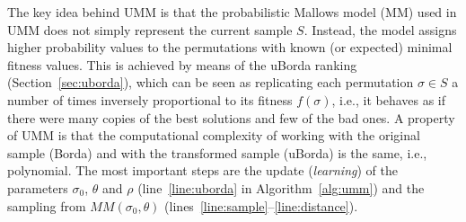 \documentclass[runningheads]{llncs}
\begin{document}
The key idea behind UMM is that the probabilistic Mallows model (MM) used in
UMM does not simply represent the current sample $S$. Instead, the model
assigns higher probability values to the permutations with known (or expected)
minimal fitness values. This is achieved by means of the uBorda ranking
(Section~\ref{sec:uborda}), which can be seen as replicating each permutation
$\sigma \in S$ a number of times inversely proportional to its fitness
$f(\sigma)$, i.e., it behaves as if there were many copies of the best
solutions and few of the bad ones. A property of UMM is that the
computational complexity of working with the original sample (Borda) and with the
transformed sample (uBorda) is the same, i.e., polynomial. The most important steps are the update
(\emph{learning}) of the parameters $\sigma_0$, $\theta$ and $\rho$ (line~\ref{line:uborda} in Algorithm~\ref{alg:umm}) and
the sampling from $MM(\sigma_0,\theta)$ (lines~\ref{line:sample}--\ref{line:distance}). %






\newcommand{\Edist}{\ensuremath{\mathbb{E}[D]}}
\end{document}
